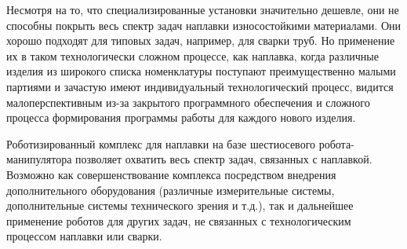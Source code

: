 Несмотря на то, что специализированные установки значительно дешевле, они не способны покрыть весь спектр задач наплавки износостойкими материалами.
Они хорошо подходят для типовых задач, например, для сварки труб.
Но применение их в таком технологически сложном процессе, как наплавка, когда различные изделия из широкого списка номенклатуры поступают преимущественно малыми партиями и зачастую имеют индивидуальный технологический процесс, видится малоперспективным из-за закрытого программного обеспечения и сложного процесса формирования программы работы для каждого нового изделия.

Роботизированный комплекс для наплавки на базе шестиосевого робота-манипулятора позволяет охватить весь спектр задач, связанных с наплавкой.
Возможно как совершенствование комплекса посредством внедрения дополнительного оборудования (различные измерительные системы, дополнительные системы технического зрения и т.д.), так и дальнейшее применение роботов для других задач, не связанных с технологическим процессом наплавки или сварки.
